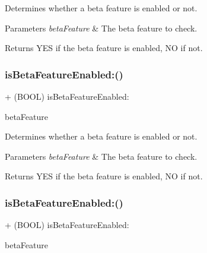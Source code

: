 Determines whether a beta feature is enabled or not.


\begin{DoxyParams}{Parameters}
{\em beta\+Feature} & The beta feature to check.\\
\hline
\end{DoxyParams}
\begin{DoxyReturn}{Returns}
Y\+ES if the beta feature is enabled, NO if not. 
\end{DoxyReturn}
\mbox{\label{interfaceFBSettings_a16d812cddbf44b8d354393d68757945f}} 
\subsubsection{\texorpdfstring{is\+Beta\+Feature\+Enabled\+:()}{isBetaFeatureEnabled:()}\hspace{0.1cm}{\footnotesize\ttfamily [4/5]}}
{\footnotesize\ttfamily + (B\+O\+OL) is\+Beta\+Feature\+Enabled\+: \begin{DoxyParamCaption}\item[{(F\+B\+Beta\+Features)}]{beta\+Feature }\end{DoxyParamCaption}}

Determines whether a beta feature is enabled or not.


\begin{DoxyParams}{Parameters}
{\em beta\+Feature} & The beta feature to check.\\
\hline
\end{DoxyParams}
\begin{DoxyReturn}{Returns}
Y\+ES if the beta feature is enabled, NO if not. 
\end{DoxyReturn}
\mbox{\label{interfaceFBSettings_a16d812cddbf44b8d354393d68757945f}} 
\subsubsection{\texorpdfstring{is\+Beta\+Feature\+Enabled\+:()}{isBetaFeatureEnabled:()}\hspace{0.1cm}{\footnotesize\ttfamily [5/5]}}
{\footnotesize\ttfamily + (B\+O\+OL) is\+Beta\+Feature\+Enabled\+: \begin{DoxyParamCaption}\item[{(F\+B\+Beta\+Features)}]{beta\+Feature }\end{DoxyParamCaption}}

